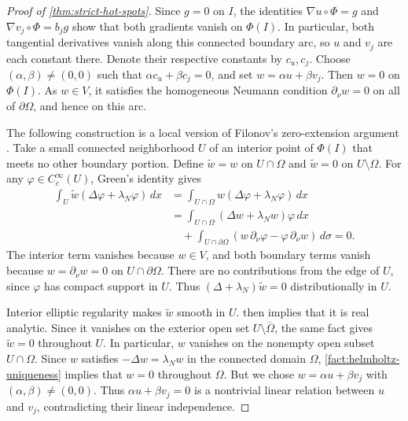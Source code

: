 \begin{proof}[Proof of \cref{thm:strict-hot-spots}]
Since $g=0$ on $I$, the identities $\nabla u\circ\Phi=g$ and
$\nabla v_j\circ\Phi=b_jg$ show that both gradients vanish on
$\Phi(I)$. In particular, both tangential derivatives vanish along
this connected boundary arc, so $u$ and $v_j$ are each constant
there. Denote their respective constants by $c_u,c_j$. Choose
$(\alpha,\beta)\ne(0,0)$ such that $\alpha c_u+\beta c_j=0$, and set
$w=\alpha u+\beta v_j$. Then $w=0$ on $\Phi(I)$.
As $w\in V$, it satisfies the homogeneous Neumann condition
$\partial_\nu w=0$ on all of $\partial\Omega$, and hence on this arc.

The following construction is a local version of Filonov's
zero-extension argument \cite[Lemma, p.~414]{Fil05}.
Take a small connected neighborhood $U$ of an interior point of
$\Phi(I)$ that meets no other boundary portion. Define
$\widetilde w=w$ on $U\cap\Omega$ and $\widetilde w=0$ on
$U\setminus\Omega$. For any $\varphi\in C_c^\infty(U)$, Green's
identity gives
\begin{align*}
 \int_U\widetilde w(\Delta\varphi+\lambda_N\varphi)\,dx
 &=\int_{U\cap\Omega}w(\Delta\varphi+\lambda_N\varphi)\,dx\\
 &=\int_{U\cap\Omega}(\Delta w+\lambda_Nw)\varphi\,dx\\
 &\quad+\int_{U\cap\partial\Omega}
       (w\,\partial_\nu\varphi-\varphi\,\partial_\nu w)\,d\sigma
 =0.
\end{align*}
The interior term vanishes because $w\in V$, and both boundary terms
vanish because $w=\partial_\nu w=0$ on $U\cap\partial\Omega$.
There are no contributions from the edge of $U$, since $\varphi$
has compact support in $U$. Thus
$(\Delta+\lambda_N)\widetilde w=0$ distributionally in $U$.

Interior elliptic regularity makes $\widetilde w$ smooth in $U$.
 then implies that it is real analytic. Since it vanishes
on the exterior open set $U\setminus\overline\Omega$, the same fact
gives $\widetilde w=0$ throughout $U$.
In particular, $w$ vanishes on the nonempty open subset $U\cap\Omega$.
Since $w$ satisfies $-\Delta w=\lambda_Nw$ in the connected domain
$\Omega$, \cref{fact:helmholtz-uniqueness} implies that $w=0$ throughout $\Omega$.
But we chose $w=\alpha u+\beta v_j$ with $(\alpha,\beta)\ne(0,0)$.
Thus $\alpha u+\beta v_j=0$ is a nontrivial linear relation between
$u$ and $v_j$, contradicting their linear independence.


\end{proof}
